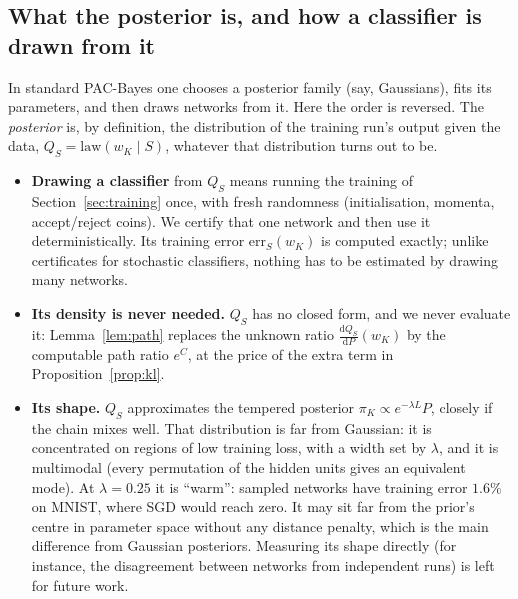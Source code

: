 \documentclass[11pt]{article}
\theoremstyle{definition}
\theoremstyle{remark}
\newcommand{\err}{\mathrm{err}}
\newcommand{\dd}{\mathrm{d}}
\begin{document}
\subsection{What the posterior is, and how a classifier is drawn from it}\label{sec:posterior}
In standard PAC-Bayes one chooses a posterior family (say, Gaussians), fits its parameters, and then draws networks from
it. Here the order is reversed. The \emph{posterior} is, by definition, the distribution of the training run's output
given the data, $Q_S=\mathrm{law}(w_K\mid S)$, whatever that distribution turns out to be.
\begin{itemize}[nosep]
\item \textbf{Drawing a classifier} from $Q_S$ means running the training of Section~\ref{sec:training} once, with fresh
  randomness (initialisation, momenta, accept/reject coins). We certify that one network and then use it
  deterministically. Its training error $\err_S(w_K)$ is computed exactly; unlike certificates for stochastic
  classifiers, nothing has to be estimated by drawing many networks.
\item \textbf{Its density is never needed.} $Q_S$ has no closed form, and we never evaluate it: Lemma~\ref{lem:path}
  replaces the unknown ratio $\frac{\dd Q_S}{\dd P}(w_K)$ by the computable path ratio $e^C$, at the price of the extra term
  in Proposition~\ref{prop:kl}.
\item \textbf{Its shape.} $Q_S$ approximates the tempered posterior $\pi_K\propto e^{-\lambda L}P$, closely if the chain
  mixes well. That distribution is far from Gaussian: it is concentrated on regions of low training loss, with a width set
  by $\lambda$, and it is multimodal (every permutation of the hidden units gives an equivalent mode). At $\lambda=0.25$ it
  is ``warm'': sampled networks have training error $1.6\%$ on MNIST, where SGD would reach zero. It may sit far from the
  prior's centre in parameter space without any distance penalty, which is the main difference from Gaussian posteriors.
  Measuring its shape directly (for instance, the disagreement between networks from independent runs) is left for
  future work.
\end{itemize}
\end{document}
